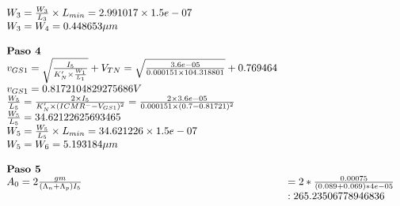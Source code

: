 \begin{equation}
\begin{array}{l l}
		W_{3} = \frac{W_3}{L_3} \times L_{min} =  2.991017 \times 1.5e-07  \\
		W_{3} = W_{4} =  0.448653  \mu m \\
		\\
		\textbf{Paso 4} \\
		v_{GS1} = \sqrt{\frac{I_{5}}{K'_{N}\times\frac{W_{1}}{L_{1}}}}+V_{TN} = \sqrt{\frac{ 3.6e-05 }{ 0.000151 \times 104.318801 }}+ 0.769464  \\
		v_{GS1} =  0.8172104829275686  V \\
		\frac{W_{5}}{L_{5}} = \frac{2\times I_{5}}{K'_{N}\times (ICMR^{-}-V_{{GS1}})^{2}} = \frac{2\times 3.6e-05 }{ 0.000151 \times ( 0.7 - 0.81721 )^{2}} \\
		\frac{W_5}{L_5} =  34.62122625693465  \\
		W_{5} = \frac{W_5}{L_5} \times L_{min} =  34.621226 \times 1.5e-07  \\
		W_{5} = W_{6} =  5.193184  \mu m \\
		\\
		\textbf{Paso 5} \\
		A_0=2\frac{gm}{(\Lambda{}_n+\Lambda{}_p)I_5}&=2*\frac{0.00075}{(0.089+0.069)*4e-05} \\
		\text{}&: 265.23506778946836 \\
	\end{array}
\end{equation}


